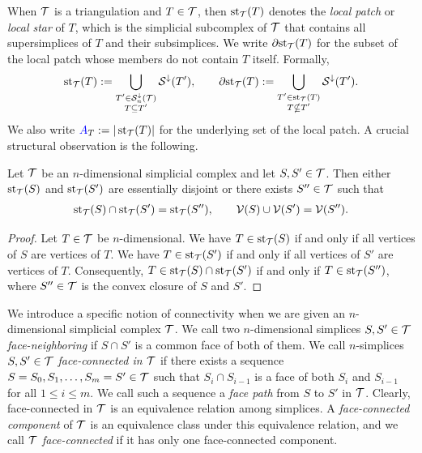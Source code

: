 \documentclass[10pt,a4paper]{article}
\begin{document}
When ${\mathcal T}$ is a triangulation and $T \in {\mathcal T}$, then $\operatorname{st}_{{\mathcal T}}(T)$ denotes the \emph{local patch} or \textit{local star} of $T$, 
which is the simplicial subcomplex of ${\mathcal T}$ that contains all supersimplices of $T$ and their subsimplices. 
We write ${\partial \rm st}_{{\mathcal T}}(T)$ for the subset of the local patch whose members do not contain $T$ itself. 
Formally,
\begin{gather*}
    \operatorname{st}_{{\mathcal T}}(T) := \bigcup_{ \substack{ T' \in {\mathcal S}^{\downarrow}_{n}({\mathcal T}) \\ T \subseteq T' } } {\mathcal S}^{\downarrow}(T'),
    \qquad 
    {\partial \rm st}_{{\mathcal T}}(T) := \bigcup_{ \substack{ T' \in \operatorname{st}_{{\mathcal T}}(T) \\ T \nsubseteq T' } } {\mathcal S}^{\downarrow}(T').
\end{gather*}
We also write ${\color{blue}A}_T := | \operatorname{st}_{{\mathcal T}}(T) |$ for the underlying set of the local patch. 
A crucial structural observation is the following.

\begin{lemma}
 Let ${\mathcal T}$ be an $n$-dimensional simplicial complex and let $S,S' \in {\mathcal T}$.
 Then either $\operatorname{st}_{{\mathcal T}}(S)$ and $\operatorname{st}_{{\mathcal T}}(S')$ are essentially disjoint or there exists $S'' \in {\mathcal T}$
 such that 
 \begin{align*}
    \operatorname{st}_{{\mathcal T}}(S) \cap \operatorname{st}_{{\mathcal T}}(S') = \operatorname{st}_{{\mathcal T}}(S''),
    \qquad 
    {\mathcal V}(S) \cup {\mathcal V}(S') = {\mathcal V}(S'').
 \end{align*}
\end{lemma}
\begin{proof}
 Let $T \in {\mathcal T}$ be $n$-dimensional.
 We have $T \in \operatorname{st}_{{\mathcal T}}(S )$ if and only if all vertices of $S $ are vertices of $T$.
 We have $T \in \operatorname{st}_{{\mathcal T}}(S')$ if and only if all vertices of $S'$ are vertices of $T$.
 Consequently, $T \in \operatorname{st}_{{\mathcal T}}(S) \cap \operatorname{st}_{{\mathcal T}}(S')$ if and only if $T \in \operatorname{st}_{{\mathcal T}}(S'')$,
 where $S'' \in {\mathcal T}$ is the convex closure of $S$ and $S'$.
\end{proof}

We introduce a specific notion of connectivity when we are given an $n$-dimensional simplicial complex ${\mathcal T}$. 
We call two $n$-dimensional simplices $S, S' \in {\mathcal T}$ \emph{face-neighboring} if $S \cap S'$ is a common face of both of them. 
We call $n$-simplices $S,S' \in {\mathcal T}$ \emph{face-connected in ${\mathcal T}$} if there exists a sequence $S=S_0,S_1,\dots,S_m=S' \in {\mathcal T}$ such that $S_{i} \cap S_{i-1}$ is a face of both $S_{i}$ and $S_{i-1}$ for all $1 \leq i \leq m$. 
We call such a sequence a \emph{face path} from $S$ to $S'$ in ${\mathcal T}$. 
Clearly, face-connected in ${\mathcal T}$ is an equivalence relation among simplices. 
A \emph{face-connected component} of ${\mathcal T}$ is an equivalence class under this equivalence relation, 
and we call ${\mathcal T}$ \emph{face-connected} if it has only one face-connected component. 
\end{document}
